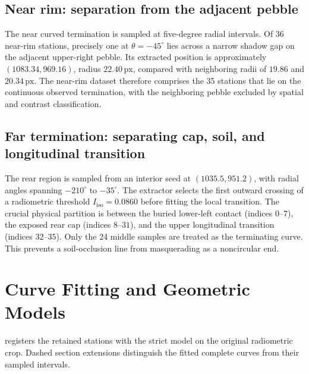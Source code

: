 \documentclass[11pt,letterpaper]{article}
\newcommand{\px}{\,\mathrm{px}}
\begin{document}
\subsection{Near rim: separation from the adjacent pebble}

The near curved termination is sampled at five-degree radial intervals. Of 36 near-rim stations, precisely one at \(\theta=-45^\circ\) lies across a narrow shadow gap on the adjacent upper-right pebble. Its extracted position is approximately \((1083.34,969.16)\), radius \(22.40\px\), compared with neighboring radii of \(19.86\) and \(20.34\px\). The near-rim dataset therefore comprises the 35 stations that lie on the continuous observed termination, with the neighboring pebble excluded by spatial and contrast classification.

\subsection{Far termination: separating cap, soil, and longitudinal transition}

The rear region is sampled from an interior seed at \((1035.5,951.2)\), with radial angles spanning \(-210^\circ\) to \(-35^\circ\). The extractor selects the first outward crossing of a radiometric threshold \(I_{\mathrm{iso}}=0.0860\) before fitting the local transition. The crucial physical partition is between the buried lower-left contact (indices \(0\)--\(7\)), the exposed rear cap (indices \(8\)--\(31\)), and the upper longitudinal transition (indices \(32\)--\(35\)). Only the 24 middle samples are treated as the terminating curve. This prevents a soil-occlusion line from masquerading as a noncircular end.

\section{Curve Fitting and Geometric Models}
\label{sec:models}

 registers the retained stations with the strict model on the original radiometric crop. Dashed section extensions distinguish the fitted complete curves from their sampled intervals.
\end{document}
